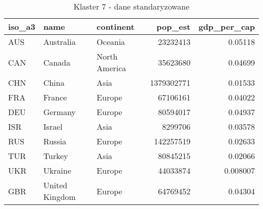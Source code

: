 \begin{table}[h!]
    \centering
    \caption{Klaster 7 - dane standaryzowane}
    \label{tab:cl7std}
    \begin{tabular}{lllrr}
        \toprule
        iso\_a3 & name           & continent     & pop\_est   & gdp\_per\_cap \\
        \midrule
        AUS     & Australia      & Oceania       & 23232413   & 0.05118       \\
        CAN     & Canada         & North America & 35623680   & 0.04699       \\
        CHN     & China          & Asia          & 1379302771 & 0.01533       \\
        FRA     & France         & Europe        & 67106161   & 0.04022       \\
        DEU     & Germany        & Europe        & 80594017   & 0.04937       \\
        ISR     & Israel         & Asia          & 8299706    & 0.03578       \\
        RUS     & Russia         & Europe        & 142257519  & 0.02633       \\
        TUR     & Turkey         & Asia          & 80845215   & 0.02066       \\
        UKR     & Ukraine        & Europe        & 44033874   & 0.008007      \\
        GBR     & United Kingdom & Europe        & 64769452   & 0.04304       \\
        \bottomrule
    \end{tabular}
\end{table}
